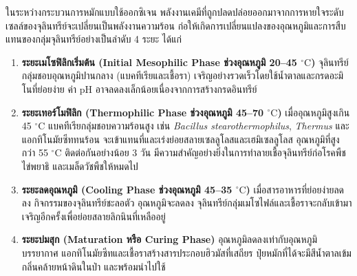 ในระหว่างกระบวนการหมักแบบใช้ออกซิเจน พลังงานเคมีที่ถูกปลดปล่อยออกมาจากการหายใจระดับเซลล์ของจุลินทรีย์จะเปลี่ยนเป็นพลังงานความร้อน ก่อให้เกิดการเปลี่ยนแปลงของอุณหภูมิและการสืบแทนของกลุ่มจุลินทรีย์อย่างเป็นลำดับ 4 ระยะ ได้แก่
\begin{enumerate}
    \item \textbf{ระยะเมโซฟิลิกเริ่มต้น (Initial Mesophilic Phase ช่วงอุณหภูมิ 20--45 $^\circ\text{C}$)} จุลินทรีย์กลุ่มชอบอุณหภูมิปานกลาง (แบคทีเรียและเชื้อรา) เจริญอย่างรวดเร็วโดยใช้น้ำตาลและกรดอะมิโนที่ย่อยง่าย ค่า pH อาจลดลงเล็กน้อยเนื่องจากการสร้างกรดอินทรีย์
    \item \textbf{ระยะเทอร์โมฟิลิก (Thermophilic Phase ช่วงอุณหภูมิ 45--70 $^\circ\text{C}$)} เมื่ออุณหภูมิสูงเกิน 45 $^\circ\text{C}$ แบคทีเรียกลุ่มชอบความร้อนสูง เช่น \textit{Bacillus stearothermophilus}, \textit{Thermus} และแอกทิโนมัยซีททนร้อน จะเข้าแทนที่และเร่งย่อยสลายเซลลูโลสและเฮมิเซลลูโลส อุณหภูมิที่สูงกว่า 55 $^\circ\text{C}$ ติดต่อกันอย่างน้อย 3 วัน มีความสำคัญอย่างยิ่งในการทำลายเชื้อจุลินทรีย์ก่อโรคพืช ไข่พยาธิ และเมล็ดวัชพืชให้หมดไป
    \item \textbf{ระยะลดอุณหภูมิ (Cooling Phase ช่วงอุณหภูมิ 45--35 $^\circ\text{C}$)} เมื่อสารอาหารที่ย่อยง่ายลดลง กิจกรรมของจุลินทรีย์ชะลอตัว อุณหภูมิจะลดลง จุลินทรีย์กลุ่มเมโซไฟล์และเชื้อราจะกลับเข้ามาเจริญอีกครั้งเพื่อย่อยสลายลิกนินที่เหลืออยู่
    \item \textbf{ระยะบ่มสุก (Maturation หรือ Curing Phase)} อุณหภูมิลดลงเท่ากับอุณหภูมิบรรยากาศ แอกทิโนมัยซีทและเชื้อราสร้างสารประกอบฮิวมัสที่เสถียร ปุ๋ยหมักที่ได้จะมีสีน้ำตาลเข้ม กลิ่นคล้ายหน้าดินในป่า และพร้อมนำไปใช้
\end{enumerate}

